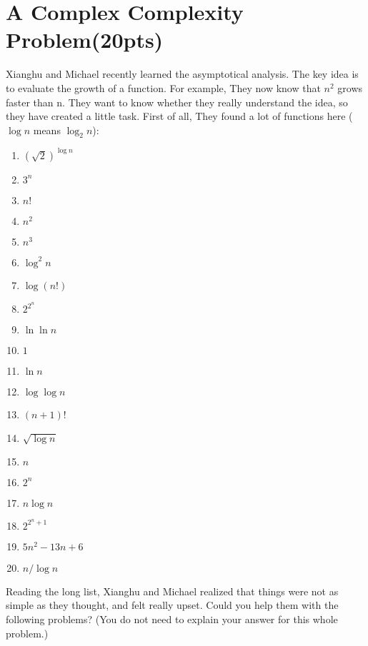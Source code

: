\documentclass{article}[12pt]
\newcommand\encircle[1]{\raisebox{.5pt}{\textcircled{\raisebox{-.9pt} {\footnotesize #1}}} }
\begin{document}
\section{A Complex Complexity Problem(20pts)}
Xianghu and Michael recently learned the asymptotical analysis. The key idea is to evaluate the growth of a function. For example, They now know that $n^2$ grows faster than n. They want to know whether they really understand the idea, so they have created a little task. First of all, They found a lot of functions here ($\log {n}$ means $\log_2 n$):
\begin{center}
\begin{multicols}{4}
\begin{enumerate}[label=\encircle{\arabic*}]
  \item $(\sqrt{2})^{\log n}$
  \item $3^n$
  \item $n!$
  \item $n^2$
  \item $n^3$
  \item $\log^2n$
  \item $\log(n!)$
  \item $2^{2^n}$
  \item $\ln\ln n$
  \item $1$
  \item $\ln n$
  \item $\log \log n$
  \item $(n+1)!$
  \item $\sqrt{\log n}$
  \item $n$
  \item $2^n$
  \item $n\log n$
  \item $2^{2^n+1}$
  \item $5n^2-13n+6$
  \item $n/\log n$
\end{enumerate}
\end{multicols}
\end{center}
Reading the long list, Xianghu and Michael realized that things were not as simple as they thought, and felt really upset. Could you help them with the following problems? (You do not need to explain your answer for this whole problem.)
\end{document}
